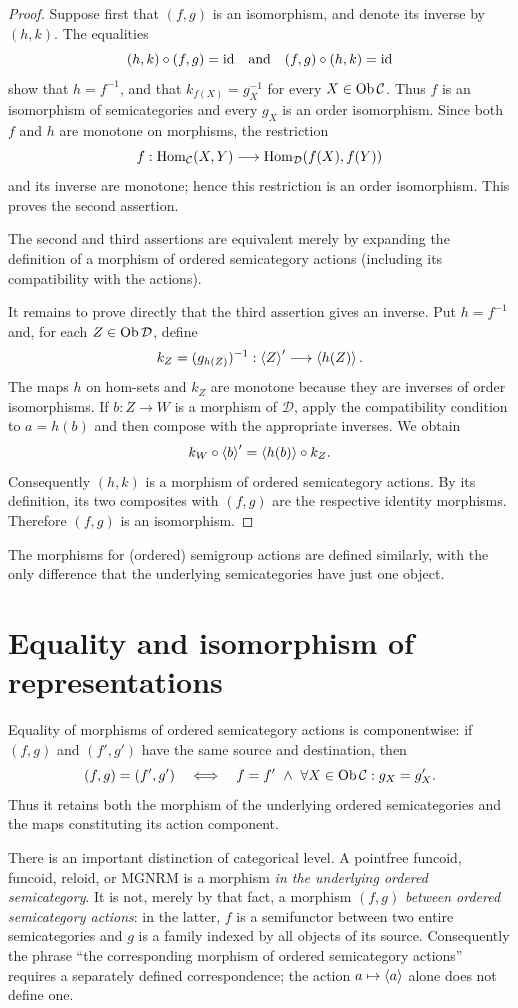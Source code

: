 \begin{proof}
Suppose first that $(f,g)$ is an isomorphism, and denote its inverse by
$(h,k)$.  The equalities
\[
(h,k)\circ(f,g)={\operatorname{id}}
\quad\text{and}\quad
(f,g)\circ(h,k)={\operatorname{id}}
\]
show that $h=f^{-1}$, and that $k_{f(X)}=g_X^{-1}$ for every
$X\in\operatorname{Ob}\mathcal C$.  Thus $f$ is an isomorphism of semicategories and
every $g_X$ is an order isomorphism.  Since both $f$ and $h$ are monotone
on morphisms, the restriction
\[
f:\operatorname{Hom}_{\mathcal C}(X,Y)\longrightarrow
  \operatorname{Hom}_{\mathcal D}(f(X),f(Y))
\]
and its inverse are monotone; hence this restriction is an order
isomorphism.  This proves the second assertion.

The second and third assertions are equivalent merely by expanding the
definition of a morphism of ordered semicategory actions (including its
compatibility with the actions).

It remains to prove directly that the third assertion gives an inverse.
Put $h=f^{-1}$ and, for each $Z\in\operatorname{Ob}\mathcal D$, define
\[
k_Z=(g_{h(Z)})^{-1}:\left\langle Z\right\rangle'\longrightarrow\left\langle h(Z)\right\rangle.
\]
The maps $h$ on hom-sets and $k_Z$ are monotone because they are inverses
of order isomorphisms.  If $b:Z\to W$ is a morphism of $\mathcal D$, apply
the compatibility condition to $a=h(b)$ and then compose with the
appropriate inverses.  We obtain
\[
k_W\circ\left\langle b\right\rangle'=\left\langle h(b)\right\rangle\circ k_Z.
\]
Consequently $(h,k)$ is a morphism of ordered semicategory actions.
By its definition, its two composites with $(f,g)$ are the respective
identity morphisms.  Therefore $(f,g)$ is an isomorphism.
\end{proof}

The morphisms for (ordered) semigroup actions are defined similarly, with the only difference that the underlying semicategories have just one object.

\section{Equality and isomorphism of representations}

Equality of morphisms of ordered semicategory actions is componentwise:
if $(f,g)$ and $(f',g')$ have the same source and destination, then
\[
(f,g)=(f',g')\quad\Longleftrightarrow\quad
f=f'\ \land\ \forall X\in\operatorname{Ob}\mathcal C:g_X=g'_X.
\]
Thus it retains both the morphism of the underlying ordered
semicategories and the maps constituting its action component.

There is an important distinction of categorical level.  A pointfree
funcoid, funcoid, reloid, or MGNRM is a morphism \emph{in the underlying
ordered semicategory}.  It is not, merely by that fact, a morphism
$(f,g)$ \emph{between ordered semicategory actions}: in the latter,
$f$ is a semifunctor between two entire semicategories and $g$ is a family
indexed by all objects of its source.  Consequently the phrase
``the corresponding morphism of ordered semicategory actions'' requires a
separately defined correspondence; the action $a\mapsto\left\langle a\right\rangle$ alone
does not define one.

